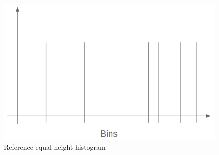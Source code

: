 \begin{figure}[!htb]
    \begin{center}
      \includegraphics[scale=0.4]{figures/ref-bins.png}
      \caption[]{Reference equal-height histogram}
      \label{fig:ref-hist-bins}
    \end{center}
\end{figure}

